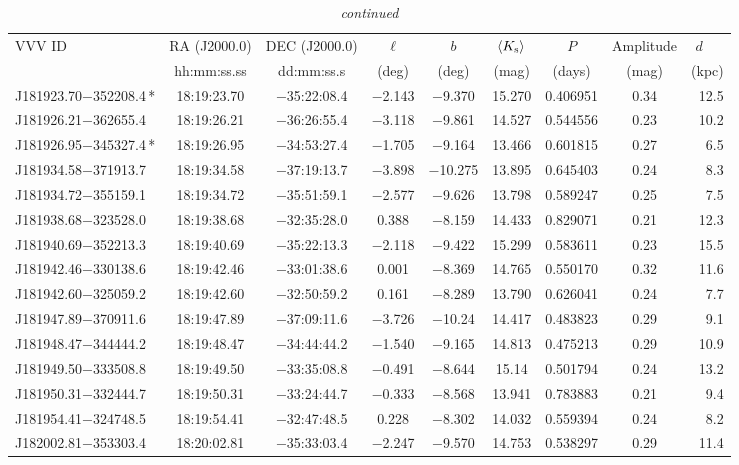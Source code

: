 \begin{table*}
\centering
\caption[]{{\it continued}}
\begin{tabular}{lcccccccr}
\hline \hline
VVV ID & RA (J2000.0)  & DEC (J2000.0) & $\ell$ & $b$ &  $\langle K_{\rm s} \rangle$ & $P$ & Amplitude & $d$~~~ \\
     & hh:mm:ss.ss    & dd:mm:ss.s   &  (deg) & (deg) &   (mag)       & (days) & (mag) & (kpc)   \\
\hline
J181923.70$-$352208.4\,* & 18:19:23.70 & $-$35:22:08.4 & $-$2.143 & $-$9.370 & 15.270 & 0.406951 & 0.34 & 12.5 \\
J181926.21$-$362655.4 & 18:19:26.21 & $-$36:26:55.4 & $-$3.118 & $-$9.861 & 14.527 & 0.544556 & 0.23 & 10.2 \\
J181926.95$-$345327.4\,* & 18:19:26.95 & $-$34:53:27.4 & $-$1.705 & $-$9.164 & 13.466 & 0.601815 & 0.27 & 6.5 \\
J181934.58$-$371913.7 & 18:19:34.58 & $-$37:19:13.7 & $-$3.898 & $-$10.275 & 13.895 & 0.645403 & 0.24 & 8.3 \\
J181934.72$-$355159.1 & 18:19:34.72 & $-$35:51:59.1 & $-$2.577 & $-$9.626 & 13.798 & 0.589247 & 0.25 & 7.5 \\
J181938.68$-$323528.0 & 18:19:38.68 & $-$32:35:28.0 &  0.388 & $-$8.159 & 14.433 & 0.829071 & 0.21 & 12.3 \\
J181940.69$-$352213.3 & 18:19:40.69 & $-$35:22:13.3 & $-$2.118 & $-$9.422 & 15.299 & 0.583611 & 0.23 & 15.5 \\
J181942.46$-$330138.6 & 18:19:42.46 & $-$33:01:38.6 &  0.001 & $-$8.369 & 14.765 & 0.550170 & 0.32 & 11.6 \\
J181942.60$-$325059.2 & 18:19:42.60 & $-$32:50:59.2 &  0.161 & $-$8.289 & 13.790 & 0.626041 & 0.24 & 7.7 \\
J181947.89$-$370911.6 & 18:19:47.89 & $-$37:09:11.6 & $-$3.726 & $-$10.24 & 14.417 & 0.483823 & 0.29 & 9.1 \\
J181948.47$-$344444.2 & 18:19:48.47 & $-$34:44:44.2 & $-$1.540 & $-$9.165 & 14.813 & 0.475213 & 0.29 & 10.9 \\
J181949.50$-$333508.8 & 18:19:49.50 & $-$33:35:08.8 & $-$0.491 & $-$8.644 & 15.14 & 0.501794 & 0.24 & 13.2 \\
J181950.31$-$332444.7 & 18:19:50.31 & $-$33:24:44.7 & $-$0.333 & $-$8.568 & 13.941 & 0.783883 & 0.21 & 9.4 \\
J181954.41$-$324748.5 & 18:19:54.41 & $-$32:47:48.5 &  0.228 & $-$8.302 & 14.032 & 0.559394 & 0.24 & 8.2 \\
J182002.81$-$353303.4 & 18:20:02.81 & $-$35:33:03.4 & $-$2.247 & $-$9.570 & 14.753 & 0.538297 & 0.29 & 11.4 \\

\end{tabular}
\end{table*}

